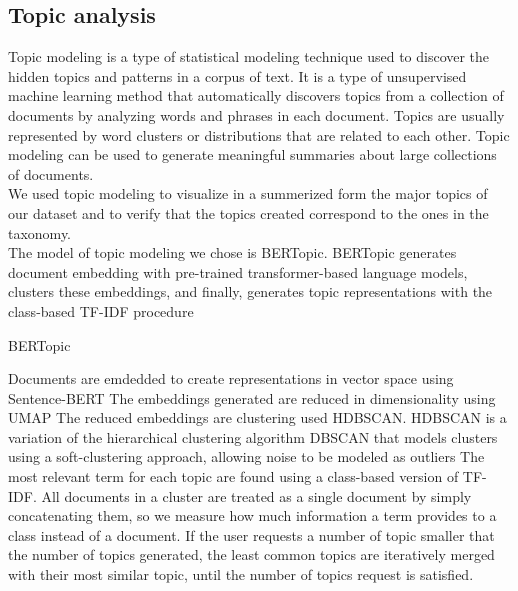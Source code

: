 
\subsection*{Topic analysis}
Topic modeling is a type of statistical modeling technique used to discover the hidden topics and patterns in a corpus of text. It is a type of unsupervised machine learning method that automatically discovers topics from a collection of documents by analyzing words and phrases in each document. Topics are usually represented by word clusters or distributions that are related to each other. Topic modeling can be used to generate meaningful summaries about large collections of documents. \\
We used topic modeling to visualize in a summerized form the major topics of our dataset and to verify that the topics created correspond to the ones in the taxonomy. \\
The model of topic modeling we chose is BERTopic\cite{grootendorst2022bertopic}. BERTopic generates document embedding with pre-trained transformer-based language models, clusters these embeddings, and finally, generates topic representations with the class-based TF-IDF procedure
\begin{algorithm}
    \caption*{BERTopic}
    \begin{algorithmic}[1]
      \State Documents are emdedded to create representations in vector space using Sentence-BERT
      \State The embeddings generated are reduced in dimensionality using UMAP
      \State The reduced embeddings are clustering used HDBSCAN. HDBSCAN is a variation of the hierarchical clustering algorithm DBSCAN that models clusters using a soft-clustering approach, allowing noise to be modeled as outliers
      \State The most relevant term for each topic are found using a class-based version of TF-IDF. All documents in a cluster are treated as a single document by simply concatenating them, so we measure how much information a term provides to a class instead of a document.
      \State If the user requests a number of topic smaller that the number of topics generated, the least common topics are iteratively merged with their most similar topic, until the number of topics request is satisfied.
    \end{algorithmic}
\end{algorithm}



